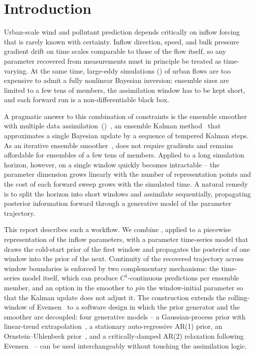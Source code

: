 \section{Introduction}
\label{sec:introduction}

Urban-scale wind and pollutant prediction depends critically on
inflow forcing that is rarely known with certainty.  Inflow direction,
speed, and bulk pressure gradient drift on time scales comparable to
those of the flow itself, so any parameter recovered from
measurements must in principle be treated as time-varying.  At the
same time, large-eddy simulations (\LES{}) of urban flows are too
expensive to admit a fully nonlinear Bayesian inversion: ensemble
sizes are limited to a few tens of members, the assimilation window
has to be kept short, and each forward run is a non-differentiable
black box.

A pragmatic answer to this combination of constraints is the
ensemble smoother with multiple data
assimilation~(\ESMDA{})~\cite{emerick2013esmda}, an ensemble Kalman
method~\cite{evensen2003ensemble,evensen2009book} that approximates a
single Bayesian update by a sequence of tempered Kalman steps.  As
an iterative ensemble smoother~\cite{stordal2018itesmda}, \ESMDA{}
does not require gradients and remains affordable for ensembles of a
few tens of members.  Applied to a long simulation horizon, however,
\ESMDA{} on a single window quickly becomes intractable -- the
parameter dimension grows linearly with the number of representation
points and the cost of each forward sweep grows with the simulated
time.  A natural remedy is to split the horizon into short windows
and assimilate sequentially, propagating posterior information
forward through a generative model of the parameter trajectory.

This report describes such a workflow.  We combine \ESMDA{}, applied
to a piecewise representation of the inflow parameters, with a
parameter time-series model that draws the cold-start prior of the
first window and propagates the posterior of one window into the
prior of the next.  Continuity of the recovered trajectory across
window boundaries is enforced by two complementary mechanisms: the
time-series model itself, which can produce $C^1$-continuous
predictions per ensemble member, and an option in the smoother to
\emph{pin} the window-initial parameter so that the Kalman update
does not adjust it.  The construction extends the rolling-window
\ESMDA{} of Evensen~\cite{evensen2024} to a software design in
which the prior generator and the smoother are decoupled: four
generative models -- a Gaussian-process prior with linear-trend
extrapolation~\cite{rasmussen2006gp}, a stationary
auto-regressive AR(1) prior, an Ornstein--Uhlenbeck
prior~\cite{uhlenbeck1930ou}, and a critically-damped AR(2)
relaxation following Evensen~\cite{evensen2024} -- can be used
interchangeably without touching the assimilation logic.

